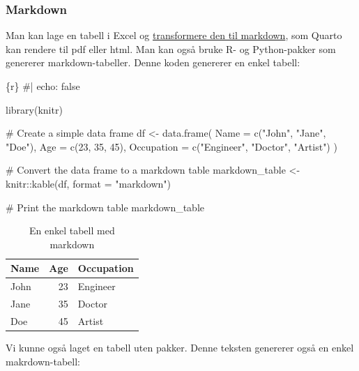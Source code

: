 \documentclass[
  10pt,
]{scrartcl}
\newenvironment{Shaded}{\begin{snugshade}}{\end{snugshade}}
\newcommand{\InformationTok}[1]{\textcolor[rgb]{0.37,0.37,0.37}{#1}}
\begin{document}
\subsubsection{Markdown}\label{markdown}

Man kan lage en tabell i Excel og
\href{https://tabletomarkdown.com/convert-spreadsheet-to-markdown/}{transformere
den til markdown}, som Quarto kan rendere til pdf eller html. Man kan
også bruke R- og Python-pakker som genererer markdown-tabeller. Denne
koden genererer en enkel tabell:

\begin{Shaded}
\begin{Highlighting}[]
\InformationTok{\textasciigrave{}\textasciigrave{}\textasciigrave{}\{r\}}
\InformationTok{\#| echo: false}

\InformationTok{library(knitr)}

\InformationTok{\# Create a simple data frame}
\InformationTok{df \textless{}{-} data.frame(}
\InformationTok{  Name = c("John", "Jane", "Doe"),}
\InformationTok{  Age = c(23, 35, 45),}
\InformationTok{  Occupation = c("Engineer", "Doctor", "Artist")}
\InformationTok{)}

\InformationTok{\# Convert the data frame to a markdown table}
\InformationTok{markdown\_table \textless{}{-} knitr::kable(df, format = "markdown")}

\InformationTok{\# Print the markdown table}
\InformationTok{markdown\_table}
\InformationTok{\textasciigrave{}\textasciigrave{}\textasciigrave{}}
\end{Highlighting}
\end{Shaded}

\begin{longtable}[]{@{}lrl@{}}

\caption{\label{tbl-md}En enkel tabell med markdown}

\tabularnewline

\toprule\noalign{}
Name & Age & Occupation \\
\midrule\noalign{}
\endhead
\bottomrule\noalign{}
\endlastfoot
John & 23 & Engineer \\
Jane & 35 & Doctor \\
Doe & 45 & Artist \\

\end{longtable}

Vi kunne også laget en tabell uten pakker. Denne teksten genererer også
en enkel makrdown-tabell:
\end{document}
